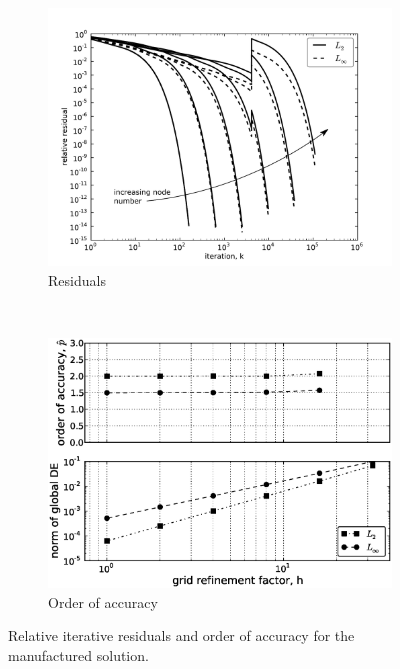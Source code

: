 \documentclass[11pt, letterpaper]{article}
\begin{document}
 
\begin{figure}
	\centering
	\begin{subfigure}[b]{0.475\textwidth}
		\centering
		\includegraphics[width=\textwidth]{./figs/MMS_resid.pdf}
		\caption{Residuals}
		\label{fig:MMS_resid}
	\end{subfigure}
	~
	\begin{subfigure}[b]{0.475\textwidth}
		\centering
		\includegraphics[width=\textwidth]{./figs/MMS_ooa.eps}
		\caption{Order of accuracy}
		\label{fig:MMS_ooa}
	\end{subfigure}
	\caption{Relative iterative residuals and order of accuracy for the
			manufactured solution.}
\end{figure}
\end{document}
